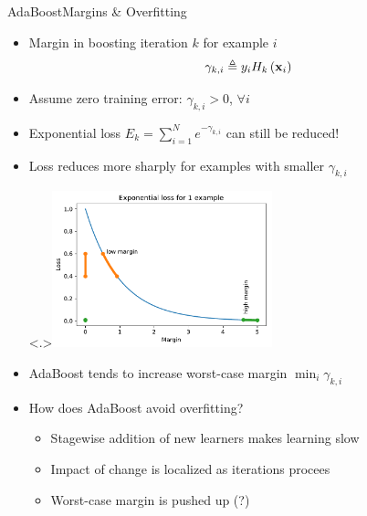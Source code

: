 \documentclass[handout]{beamer}
\begin{document}
\begin{frame}[allowframebreaks]{AdaBoost}{Margins \& Overfitting}
\begin{itemize}[<+>]
	\item \alert{Margin} in boosting iteration $ k $ for example $ i $
	\begin{gather*}
		\gamma_{k, i} \triangleq y_i H_k\left(\mathrm{\mathbf{x}}_i\right)
	\end{gather*}
	
	\item Assume zero training error: $ \gamma_{k, i} > 0 $, $ \forall i $
	
	\item Exponential loss $ E_k = \sum_{i=1}^N e^{-\gamma_{k, i}} $ can still be reduced!
	
	\item Loss reduces more sharply for examples with smaller $ \gamma_{k, i} $
	
	{\centering\includegraphics[width=0.5\textwidth]{figs/exp_loss}}
	
	\item AdaBoost tends to increase worst-case margin $ \min_i \gamma_{k, i} $
	
	\item<+-> How does AdaBoost avoid overfitting?
	\begin{itemize}[<.>]
		\item Stagewise addition of new learners makes learning slow
		\item Impact of change is localized as iterations procees
		\item Worst-case margin is pushed up (?)
	\end{itemize}
\end{itemize}
\end{frame}
\end{document}
